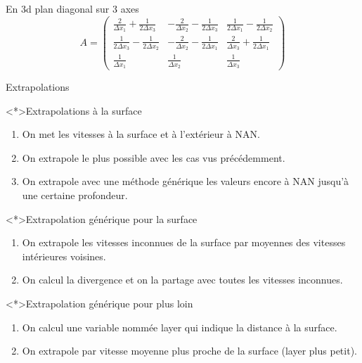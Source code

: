 \begin{frame}[shrink]{En 3d plan diagonal sur 3 axes}
\begin{equation*}
 A=\begin{pmatrix}
    \frac{2}{\Delta x_1}+\frac{1}{2\Delta x_3}&-\frac{2}{\Delta x_2}-\frac{1}{2\Delta x_3}&\frac{1}{2\Delta x_1}-\frac{1}{2\Delta x_2}\\
    \frac{1}{2\Delta x_3}-\frac{1}{2\Delta x_2}&-\frac{2}{\Delta x_2}-\frac{1}{2\Delta x_1}&\frac{2}{\Delta x_3}+\frac{1}{2\Delta x_1}\\
    \frac{1}{\Delta x_1}&\frac{1}{\Delta x_2}&\frac{1}{\Delta x_3}
   \end{pmatrix}
\end{equation*}
\end{frame}

\begin{frame}[<+->][shrink]{Extrapolations}
\begin{block}<*>{Extrapolations à la surface}

\begin{enumerate}
 \item On met les vitesses à la surface et à l'extérieur à NAN.
 \item On extrapole le plus possible avec les cas vus précédemment.
 \item On extrapole avec une méthode générique les valeurs encore à NAN jusqu'à une certaine profondeur.
\end{enumerate}

\end{block}
\begin{block}<*>{Extrapolation générique pour la surface}
\begin{enumerate}
 \item On extrapole les vitesses inconnues de la surface par moyennes des vitesses intérieures voisines.
 \item On calcul la divergence et on la partage avec toutes les vitesses inconnues.
\end{enumerate}
\end{block}

\begin{block}<*>{Extrapolation générique pour plus loin}
\begin{enumerate}
 \item On calcul une variable nommée layer qui indique la distance à la surface.
 \item On extrapole par vitesse moyenne plus proche de la surface (layer plus petit).
\end{enumerate}

 
\end{block}
 
\end{frame}

